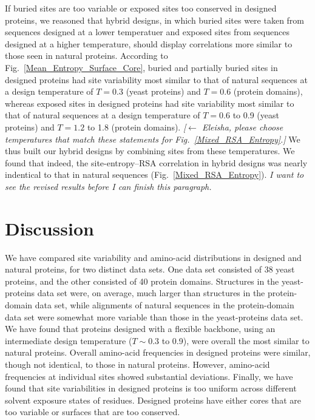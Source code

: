 \documentclass[12pt]{article}
\begin{document}
If buried sites are too variable or exposed sites too conserved in designed proteins, we reasoned that hybrid designs, in which buried sites were taken from sequences designed at a lower temperatuer and exposed sites from sequences designed at a higher temperature, should display correlations more similar to those seen in natural proteins. According to Fig.~\ref{Mean_Entropy_Surface_Core}, buried and partially buried sites in designed proteins had site variability most similar to that of natural sequences at a design temperature of $T=0.3$ (yeast proteins) and $T=0.6$ (protein domains), whereas exposed sites in designed proteins had site variability most similar to that of natural sequences at a design temperature of $T=0.6$ to 0.9 (yeast proteins) and $T=1.2$ to 1.8 (protein domains). {\color{red}\emph{[$\leftarrow$ Eleisha, please choose temperatures that match these statements for Fig.~\ref{Mixed_RSA_Entropy}.]}} We thus built our hybrid designs by combining sites from these temperatures. We found that indeed, the site-entropy--RSA correlation in hybrid designs was nearly indentical to that in natural sequences (Fig.~\ref{Mixed_RSA_Entropy}). {\color{blue}\emph{I want to see the revised results before I can finish this paragraph.}}




\section{Discussion}

We have compared site variability and amino-acid distributions in designed and natural proteins, for two distinct data sets. One data set consisted of 38 yeast proteins, and the other consisted of 40 protein domains. Structures in the yeast-proteins data set were, on average, much larger than structures in the protein-domain data set, while alignments of natural sequences in the protein-domain data set were somewhat more variable than those in the yeast-proteins data set. We have found that proteins designed with a flexible backbone, using an intermediate design temperature ($T\sim0.3$ to 0.9), were overall the most similar to natural proteins. Overall amino-acid frequencies in designed proteins were similar, though not identical, to those in natural proteins. However, amino-acid frequencies at individual sites showed substantial deviations. Finally, we have found that site variabilities in designed proteins is too uniform across different solvent exposure states of residues. Designed proteins have either cores that are too variable or surfaces that are too conserved.
\end{document}
